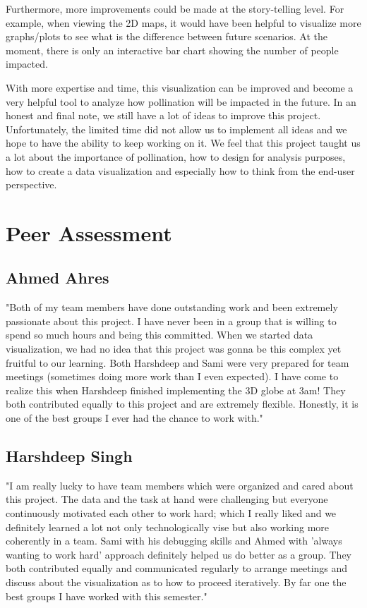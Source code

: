 \documentclass[12pt]{article}
\begin{document}
Furthermore, more improvements could be made at the story-telling level. For example, when viewing the 2D maps, it would have been helpful to visualize more graphs/plots to see what is the difference between future scenarios. At the moment, there is only an interactive bar chart showing the number of people impacted. \newline

With more expertise and time, this visualization can be improved and become a very helpful tool to analyze how pollination will be impacted in the future. \newline
In an honest and final note, we still have a lot of ideas to improve this project. Unfortunately, the limited time did not allow us to implement all ideas and we hope to have the ability to keep working on it. We feel that this project taught us a lot about the importance of pollination, how to design for analysis purposes, how to create a data visualization and especially how to think from the end-user perspective. 
\section{Peer Assessment}
\subsection{Ahmed Ahres}
"Both of my team members have done outstanding work and been extremely passionate about this project. I have never been in a group that is willing to spend so much hours and being this committed. When we started data visualization, we had no idea that this project was gonna be this complex yet fruitful to our learning. Both Harshdeep and Sami were very prepared for team meetings (sometimes doing more work than I even expected). I have come to realize this when Harshdeep finished implementing the 3D globe at 3am! They both contributed equally to this project and are extremely flexible. Honestly, it is one of the best groups I ever had the chance to work with."
\subsection{Harshdeep Singh}
"I am really lucky to have team members which were organized and cared about this project. The data and the task at hand were challenging but everyone continuously motivated each other to work hard; which I really liked and we definitely learned a lot not only technologically vise but also working more coherently in a team. Sami with his debugging skills and Ahmed with 'always wanting to work hard' approach definitely helped us do better as a group. They both contributed equally and communicated regularly to arrange meetings and discuss about the visualization as to how to proceed iteratively. By far one the best groups I have worked with this semester."
\end{document}
